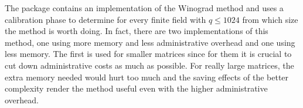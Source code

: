 % 
% 
% 
% 
% 
% 
% 
The {\cvec} package
contains an implementation of the Winograd method and uses a calibration
phase to determine for every finite field with $q \le 1024$ from which
size the method is worth doing. In fact, there are two implementations
of this method, one using more memory and less administrative overhead
and one using less memory. The first is used for smaller matrices since
for them it is crucial to cut down administrative costs as much as
possible. For really large matrices, the extra memory needed would hurt
too much and the saving effects of the better complexity render the
method useful even with the higher administrative overhead.


